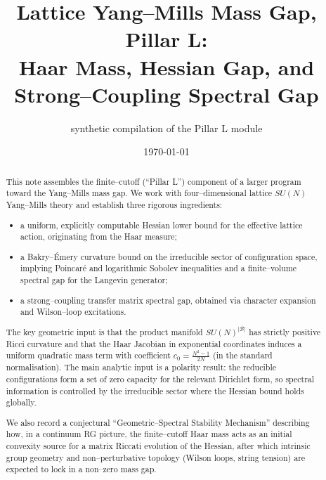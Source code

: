 \documentclass[11pt]{article}
\numberwithin{equation}{section}
\begin{document}
\title{Lattice Yang--Mills Mass Gap, Pillar L:\\
Haar Mass, Hessian Gap, and Strong--Coupling Spectral Gap}

\author{synthetic compilation of the Pillar L module}
\date{\today}

\maketitle

\begin{abstract}
This note assembles the finite--cutoff (``Pillar L'') component of a
larger program toward the Yang--Mills mass gap.  We work with
four--dimensional lattice $SU(N)$ Yang--Mills theory and establish three
rigorous ingredients:

\begin{itemize}
  \item[(L1)] a uniform, explicitly computable Hessian lower bound for
  the effective lattice action, originating from the Haar measure;

  \item[(L2)] a Bakry--\'Emery curvature bound on the irreducible sector
  of configuration space, implying Poincar\'e and logarithmic Sobolev
  inequalities and a finite--volume spectral gap for the Langevin
  generator;

  \item[(L3)] a strong--coupling transfer matrix spectral gap,
  obtained via character expansion and Wilson--loop excitations.
\end{itemize}

The key geometric input is that the product manifold
$SU(N)^{|\mathcal{B}|}$ has strictly positive Ricci curvature and that
the Haar Jacobian in exponential coordinates induces a uniform quadratic
mass term with coefficient $c_0 = \frac{N^2-1}{2N}$ (in the standard
normalisation).  The main analytic input is a polarity result: the
reducible configurations form a set of zero capacity for the relevant
Dirichlet form, so spectral information is controlled by the irreducible
sector where the Hessian bound holds globally.

We also record a conjectural ``Geometric--Spectral Stability Mechanism''
describing how, in a continuum RG picture, the finite--cutoff Haar mass
acts as an initial convexity source for a matrix Riccati evolution of
the Hessian, after which intrinsic group geometry and non--perturbative
topology (Wilson loops, string tension) are expected to lock in a
non--zero mass gap.
\end{abstract}
\end{document}
